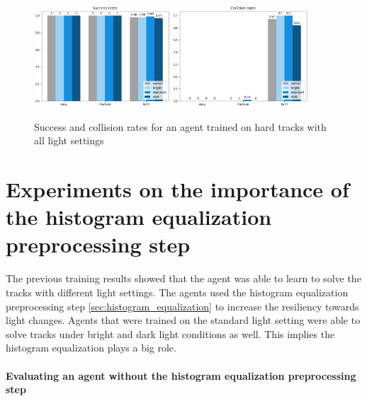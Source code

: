 \begin{figure}
    \centering
    \includegraphics[width=0.45\textwidth]{Bilder/notebook_images/hardDistanceMixedLight_eval_all_success_rates_barplot.png}
    \includegraphics[width=0.45\textwidth]{Bilder/notebook_images/hardDistanceMixedLight_eval_all_collision_rates_barplot.png}
    \caption{Success and collision rates for an agent trained on hard tracks with all light settings}
    \label{fig:hardDistance_mixedLightTraining_results}
\end{figure}



\section{Experiments on the importance of the histogram equalization preprocessing step}

The previous training results showed that the agent was able to learn to solve the tracks with different light settings. The agents used the histogram equalization preprocessing step \ref{sec:histogram_equalization} to increase the resiliency towards light changes. Agents that were trained on the standard light setting were able to solve tracks under bright and dark light conditions as well. This implies the histogram equalization plays a big role.

\paragraph{Evaluating an agent without the histogram equalization preprocessing step}

